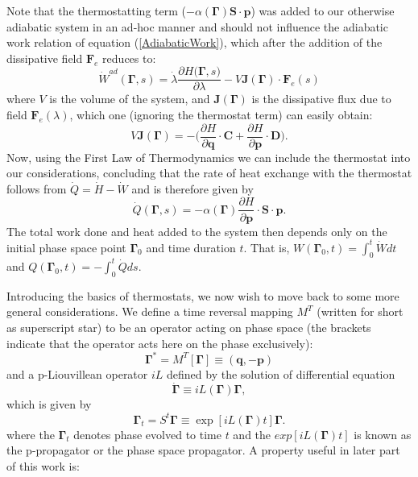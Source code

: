 \documentclass[a4paper,12pt]{article}
\begin{document}
Note that the thermostatting term ($- \alpha(\bm{\Gamma})\bm{S}\cdot\bm{p}$) was added to our otherwise adiabatic system in an ad-hoc manner and should not influence the  adiabatic work relation of equation (\ref{AdiabaticWork}), which after the addition of the dissipative field $\bm{F}_e$ reduces to:
\begin{equation}
  \dot{W}^{ad}(\bm{\Gamma},s) = \dot{\lambda} \frac{\partial{H(\bm{\Gamma}},s)}{\partial{\lambda}} - V \bm{J}(\bm{\Gamma})\cdot \bm{F}_e(s)
\end{equation}
where $V$ is the volume of the system, and $\bm{J}(\bm{\Gamma})$ is the dissipative flux due to field $\bm{F}_e(\lambda)$, which one (ignoring the thermostat term) can easily obtain:
\begin{equation}
  V \bm{J}(\bm{\Gamma}) = -\Big(\frac{\partial{H}}{\partial{\bm{q}}}\cdot \bm{C}+\frac{\partial{H}}{\partial{\bm{p}}}\cdot \bm{D}\Big).
\end{equation}
Now, using the First Law of Thermodynamics we can include the thermostat into our considerations, concluding that the rate of heat exchange with the thermostat follows from $\dot{Q}=\dot{H}-\dot{W}$ and is therefore given by
\begin{equation}
  \dot{Q}(\bm{\Gamma},s)= -\alpha(\bm{\Gamma})\frac{\partial{H}}{\partial{\bm{p}}}\cdot \bm{S}\cdot \bm{p}.
\end{equation}
The total work done and heat added to the system then depends only on the initial phase space point $\bm{\Gamma}_0$ and time duration $t$. That is, $W(\bm{\Gamma}_0,t)=\int_0^t \dot{W} dt$ and $Q(\bm{\Gamma}_0,t)=-\int_0^t \dot{Q} ds$.

Introducing the basics of thermostats, we now wish to move back to some more general considerations. 
We define a time reversal mapping $M^T$ (written for short as superscript star) to be an operator acting on phase space (the brackets indicate that the operator acts here on the phase exclusively): 
\begin{equation}
  \bm{\Gamma}^*=M^T[\bm{\Gamma}] \equiv (\bm{q},-\bm{p})
\end{equation}
and a p-Liouvillean operator $iL$ defined by the solution of differential equation 
\begin{equation}
 \dot{\bm{\Gamma}} \equiv iL(\bm{\Gamma})\bm{\Gamma},
\end{equation}
which is given by
\begin{equation}
  \bm{\Gamma}_t = S^t \bm{\Gamma} \equiv \exp[iL(\bm{\Gamma})t]\bm{\Gamma}.
\end{equation}
where the $\bm{\Gamma}_t$ denotes phase evolved to time $t$ and the $ exp[iL(\bm{\Gamma})t] $ is known as the p-propagator or the phase space propagator.
A property useful in later part of this work is:
\end{document}
